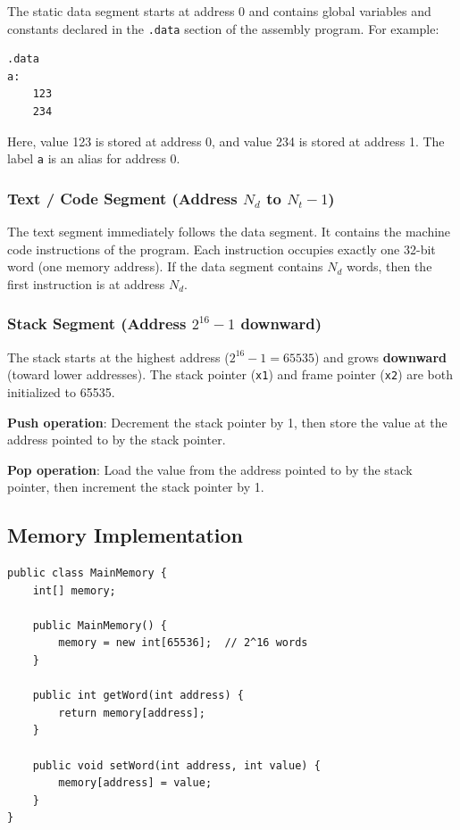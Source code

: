 \documentclass[12pt,a4paper]{article}
\begin{document}
The static data segment starts at address 0 and contains global variables and constants declared in the \texttt{.data} section of the assembly program. For example:

\begin{lstlisting}[style=asmstyle]
.data
a:
    123
    234
\end{lstlisting}

Here, value 123 is stored at address 0, and value 234 is stored at address 1. The label \texttt{a} is an alias for address 0.

\subsubsection{Text / Code Segment (Address $N_d$ to $N_t - 1$)}

The text segment immediately follows the data segment. It contains the machine code instructions of the program. Each instruction occupies exactly one 32-bit word (one memory address). If the data segment contains $N_d$ words, then the first instruction is at address $N_d$.

\subsubsection{Stack Segment (Address $2^{16} - 1$ downward)}

The stack starts at the highest address ($2^{16} - 1 = 65535$) and grows \textbf{downward} (toward lower addresses). The stack pointer (\texttt{x1}) and frame pointer (\texttt{x2}) are both initialized to 65535.

\textbf{Push operation}: Decrement the stack pointer by 1, then store the value at the address pointed to by the stack pointer.

\textbf{Pop operation}: Load the value from the address pointed to by the stack pointer, then increment the stack pointer by 1.

\subsection{Memory Implementation}

\begin{lstlisting}[style=javastyle, caption={MainMemory.java}]
public class MainMemory {
    int[] memory;

    public MainMemory() {
        memory = new int[65536];  // 2^16 words
    }

    public int getWord(int address) {
        return memory[address];
    }

    public void setWord(int address, int value) {
        memory[address] = value;
    }
}
\end{lstlisting}
\end{document}
